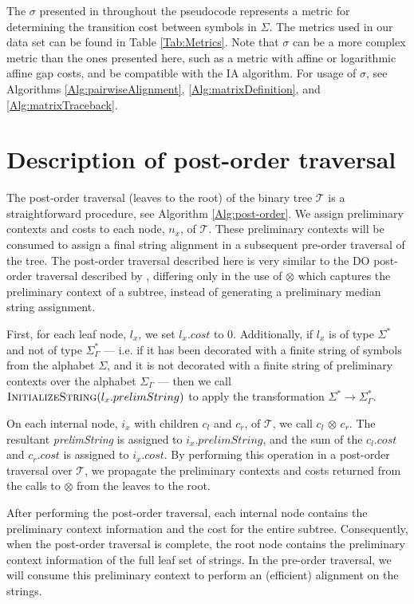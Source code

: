 \documentclass{bmcart}
\begin{document}
The $\sigma$ presented in throughout the pseudocode represents a metric for determining the transition cost between symbols in $\Sigma$. The metrics used in our data set can be found in Table \ref{Tab:Metrics}.
Note that $\sigma$ can be a more complex metric than the ones presented here, such as a metric with affine or logarithmic affine gap costs, and be compatible with the IA algorithm. For usage of $\sigma$, see Algorithms \ref{Alg:pairwiseAlignment}, \ref{Alg:matrixDefinition}, and \ref{Alg:matrixTraceback}.


\section*{Description of post-order traversal}

The post-order traversal (leaves to the root) of the binary tree $\mathcal{T}$ is a straightforward procedure, see Algorithm \ref{Alg:post-order}.
We assign preliminary contexts and costs to each node, $n_x$, of $\mathcal{T}$.
These preliminary contexts will be consumed to assign a final string alignment in a subsequent pre-order traversal of the tree.
The post-order traversal described here is very similar to the DO post-order traversal described by \cite{Wheeler2003}, differing only in the use of $\otimes$ which captures the preliminary context of a subtree, instead of generating a preliminary median string assignment.

First, for each leaf node, $l_x$, we set $l_x.cost$ to $0$.
Additionally, if $l_x$ is of type $\Sigma^{*}$ and not of type $\Sigma^{*}_{\Gamma}$ --- i.e. if it has been decorated with a finite string of symbols from the alphabet $\Sigma$, and it is not decorated with a finite string of preliminary contexts over the alphabet $\Sigma_{\Gamma}$ --- then we call $\Call{InitializeString}{l_x.prelimString}$ to apply the transformation $\Sigma^{*} \rightarrow \Sigma^{*}_{\Gamma}$.

On each internal node, $i_x$ with children $c_l$ and $c_r$, of $\mathcal{T}$, we call $c_l$ $\otimes$ $c_r$.
The resultant \textit{prelimString} is assigned to $i_x.prelimString$, and the sum of the $c_l.cost$ and $c_r.cost$ is assigned to $i_x.cost$.
By performing this operation in a post-order traversal over $\mathcal{T}$, we propagate the preliminary contexts and costs returned from the calls to $\otimes$ from the leaves to the root.

After performing the post-order traversal, each internal node contains the preliminary context information and the cost for the entire subtree.
Consequently, when the post-order traversal is complete, the root node contains the preliminary context information of the full leaf set of strings.
In the pre-order traversal, we will consume this preliminary context to perform an (efficient) alignment on the strings.
\end{document}
